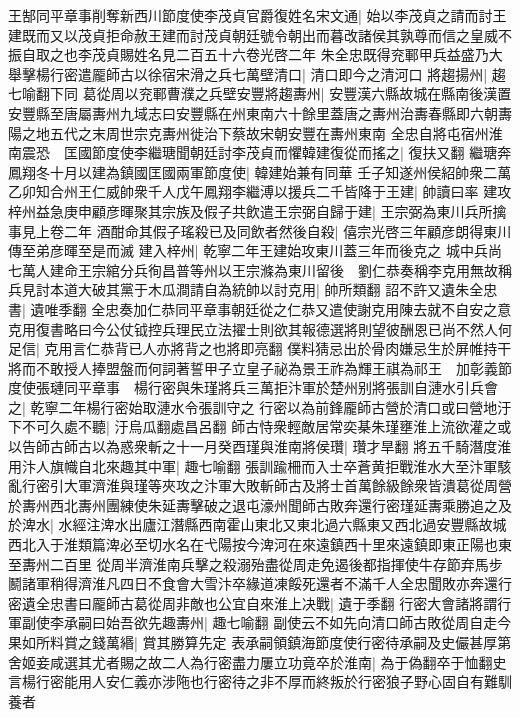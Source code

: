 王郜同平章事削奪新西川節度使李茂貞官爵復姓名宋文通|{
	始以李茂貞之請而討王建既而又以茂貞拒命赦王建而討茂貞朝廷號令朝出而暮改諸侯其孰尊而信之皇威不振自取之也李茂貞賜姓名見二百五十六卷光啓二年}
朱全忠既得兖鄆甲兵益盛乃大舉擊楊行密遣龎師古以徐宿宋滑之兵七萬壁清口|{
	清口即今之清河口}
將趨揚州|{
	趨七喻翻下同}
葛從周以兖鄆曹濮之兵壁安豐將趨夀州|{
	安豐漢六縣故城在縣南後漢置安豐縣至唐屬夀州九域志曰安豐縣在州東南六十餘里蓋唐之夀州治夀春縣即六朝夀陽之地五代之末周世宗克夀州徙治下蔡故宋朝安豐在夀州東南}
全忠自將屯宿州淮南震恐　匡國節度使李繼瑭聞朝廷討李茂貞而懼韓建復從而搖之|{
	復扶又翻}
繼瑭奔鳳翔冬十月以建為鎮國匡國兩軍節度使|{
	韓建始兼有同華}
壬子知遂州侯紹帥衆二萬乙卯知合州王仁威帥衆千人戊午鳳翔李繼溥以援兵二千皆降于王建|{
	帥讀曰率}
建攻梓州益急庚申顧彦暉聚其宗族及假子共飲遣王宗弼自歸于建|{
	王宗弼為東川兵所擒事見上卷二年}
酒酣命其假子瑤殺已及同飲者然後自殺|{
	僖宗光啓三年顧彦朗得東川傳至弟彦暉至是而滅}
建入梓州|{
	乾寧二年王建始攻東川蓋三年而後克之}
城中兵尚七萬人建命王宗綰分兵徇昌普等州以王宗滌為東川留後　劉仁恭奏稱李克用無故稱兵見討本道大破其黨于木瓜澗請自為統帥以討克用|{
	帥所類翻}
詔不許又遺朱全忠書|{
	遺唯季翻}
全忠奏加仁恭同平章事朝廷從之仁恭又遣使謝克用陳去就不自安之意克用復書略曰今公仗钺控兵理民立法擢士則欲其報德選將則望彼酬恩已尚不然人何足信|{
	克用言仁恭背已人亦將背之也將即亮翻}
僕料猜忌出於骨肉嫌忌生於屏帷持干將而不敢授人捧盟盤而何詞著誓甲子立皇子祕為景王祚為輝王祺為祁王　加彰義節度使張璉同平章事　楊行密與朱瑾將兵三萬拒汴軍於楚州别將張訓自漣水引兵會之|{
	乾寧二年楊行密始取漣水令張訓守之}
行密以為前鋒龎師古營於清口或曰營地汙下不可久處不聽|{
	汙烏瓜翻處昌呂翻}
師古恃衆輕敵居常奕棊朱瑾壅淮上流欲灌之或以告師古師古以為惑衆斬之十一月癸酉瑾與淮南將侯瓚|{
	瓚才旱翻}
將五千騎潛度淮用汴人旗幟自北來趣其中軍|{
	趣七喻翻}
張訓踰柵而入士卒蒼黄拒戰淮水大至汴軍駭亂行密引大軍濟淮與瑾等夾攻之汴軍大敗斬師古及將士首萬餘級餘衆皆潰葛從周營於夀州西北夀州團練使朱延夀擊破之退屯濠州聞師古敗奔還行密瑾延夀乘勝追之及於渒水|{
	水經注渒水出廬江潛縣西南霍山東北又東北過六縣東又西北過安豐縣故城西北入于淮類篇渒必至切水名在弋陽按今渒河在來遠鎮西十里來遠鎮即東正陽也東至夀州二百里}
從周半濟淮南兵擊之殺溺殆盡從周走免遏後都指揮使牛存節弃馬步鬭諸軍稍得濟淮凡四日不食會大雪汴卒緣道凍餒死還者不滿千人全忠聞敗亦奔還行密遺全忠書曰龎師古葛從周非敵也公宜自來淮上决戰|{
	遺于季翻}
行密大會諸將謂行軍副使李承嗣曰始吾欲先趣夀州|{
	趣七喻翻}
副使云不如先向清口師古敗從周自走今果如所料賞之錢萬緡|{
	賞其勝算先定}
表承嗣領鎮海節度使行密待承嗣及史儼甚厚第舍姬妾咸選其尤者賜之故二人為行密盡力屢立功竟卒於淮南|{
	為于偽翻卒于恤翻史言楊行密能用人安仁義亦涉陁也行密待之非不厚而終叛於行密狼子野心固自有難馴養者}
